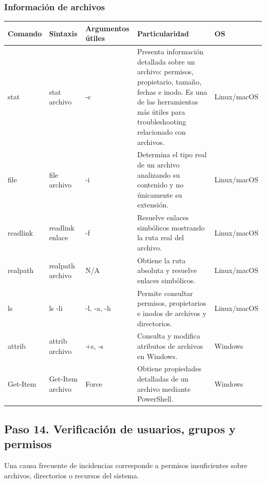 \documentclass[a4paper,10pt]{article}
\begin{document}
\subsubsection{Información de archivos}

\begin{longtable}{|p{2.8cm}|p{3.2cm}|p{4cm}|p{5.4cm}|p{1.5cm}|}

\hline
Comando &
Sintaxis &
Argumentos útiles &
Particularidad &
OS
\\
\hline
\endhead

stat &
stat archivo &
-c &
Presenta información detallada sobre un archivo: permisos, propietario, tamaño, fechas e inodo. Es una de las herramientas más útiles para troubleshooting relacionado con archivos. &
Linux/macOS
\\
\hline

file &
file archivo &
-i &
Determina el tipo real de un archivo analizando su contenido y no únicamente su extensión. &
Linux/macOS
\\
\hline

readlink &
readlink enlace &
-f &
Resuelve enlaces simbólicos mostrando la ruta real del archivo. &
Linux/macOS
\\
\hline

realpath &
realpath archivo &
N/A &
Obtiene la ruta absoluta y resuelve enlaces simbólicos. &
Linux/macOS
\\
\hline

ls &
ls -li &
-l, -a, -h &
Permite consultar permisos, propietarios e inodos de archivos y directorios. &
Linux/macOS
\\
\hline

attrib &
attrib archivo &
+s, -s &
Consulta y modifica atributos de archivos en Windows. &
Windows
\\
\hline

Get-Item &
Get-Item archivo &
Force &
Obtiene propiedades detalladas de un archivo mediante PowerShell. &
Windows
\\
\hline

\end{longtable}



\subsection{Paso 14. Verificación de usuarios, grupos y permisos}

Una causa frecuente de incidencias corresponde a permisos insuficientes sobre
archivos, directorios o recursos del sistema.
\end{document}
